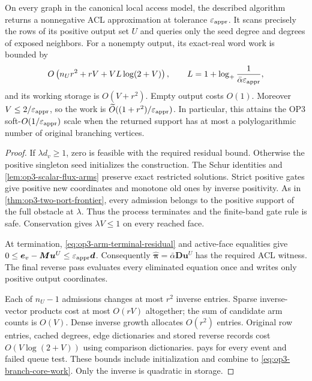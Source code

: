 \begin{theorem}
\label{thm:op3-branch-core-flux}
On every graph in the canonical local access model, the described algorithm
returns a nonnegative ACL approximation at tolerance $\varepsilon_{\mathrm{appr}}$. It scans
precisely the rows of its positive output set $U$ and queries only the seed
degree and degrees of exposed neighbors. For a nonempty output, its exact-real
word work is bounded by
\begin{equation}
 O\left(n_Ur^2+rV+VL\log(2+V)\right),\qquad
 L=1+\log_+\frac1{\bar\alpha\varepsilon_{\mathrm{appr}}},
 \label{eq:op3-branch-core-work}
\end{equation}
and its working storage is $O(V+r^2)$. Empty output costs $O(1)$.
Moreover $V\leq2/\varepsilon_{\mathrm{appr}}$, so the work is
$\widetilde O((1+r^2)/\varepsilon_{\mathrm{appr}})$. In particular, this attains the OP3
soft-$O(1/\varepsilon_{\mathrm{appr}})$ scale when the returned support has at most a
polylogarithmic number of original branching vertices.
\end{theorem}
\begin{proof}
If $\lambda d_v\geq1$, zero is feasible with the required residual bound.
Otherwise the positive singleton seed initializes the construction. The
Schur identities and \cref{lem:op3-scalar-flux-arms} preserve exact restricted
solutions. Strict positive gates give positive new coordinates and monotone
old ones by inverse positivity. As in \cref{thm:op3-two-port-frontier}, every
admission belongs to the positive support of the full obstacle at $\lambda$.
Thus the process terminates and the finite-band gate rule is safe.
Conservation gives $\lambda V\leq1$ on every reached face.

At termination, \cref{eq:op3-arm-terminal-residual} and active-face
equalities give $0\leq\bm e_v-\bm M\bm u^U\leq\varepsilon_{\mathrm{appr}}\bm d$.
Consequently $\widehat{\bm\pi}=\bar\alpha\bm D\bm u^U$ has the required
ACL witness. The final reverse pass evaluates every eliminated equation
once and writes only positive output coordinates.

Each of $n_U-1$ admissions changes at most $r^2$ inverse entries. Sparse
inverse-vector products cost at most $O(rV)$ altogether; the sum of
candidate arm counts is $O(V)$. Dense inverse growth allocates $O(r^2)$
entries. Original row entries, cached degrees, edge dictionaries and stored
reverse records cost $O(V\log(2+V))$ using comparison dictionaries.
 pays for every event and failed queue test.
These bounds include initialization and combine to
\cref{eq:op3-branch-core-work}. Only the inverse is quadratic in storage.
\end{proof}

